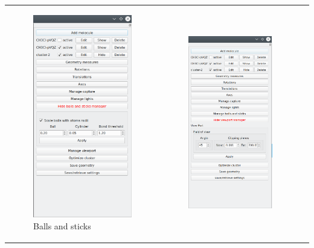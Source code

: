 \documentclass[10pt]{article}
\begin{document}
\begin{tabular}{lcr}
\begin{minipage}{.45\linewidth}
    \begin{figure}[H]
        \begin{center}
            \includegraphics[width=0.4\linewidth]{damqt320_balls_sticks.png}
        \end{center}
        \caption{Balls and sticks \label{fig:4_8}}
    \end{figure}
\end{minipage}
&
\begin{minipage}{.45\linewidth}
    \begin{figure}[H]
        \begin{center}
            \vspace*{0mm}
            \includegraphics[width=0.4\linewidth]{damqt320_viewport.png}

\end{center}
\end{figure}
\end{minipage}
\end{tabular}
\end{document}
